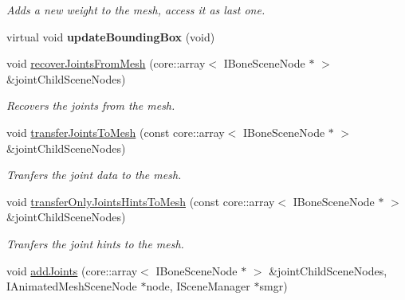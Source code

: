 \begin{DoxyCompactItemize}
\begin{DoxyCompactList}\small\item\em Adds a new weight to the mesh, access it as last one. \end{DoxyCompactList}\item 
\hypertarget{classirr_1_1scene_1_1_c_skinned_mesh_a9049fdf0faaa79fc27394571ddc62e58}{virtual void {\bfseries update\-Bounding\-Box} (void)}\label{classirr_1_1scene_1_1_c_skinned_mesh_a9049fdf0faaa79fc27394571ddc62e58}

\item 
\hypertarget{classirr_1_1scene_1_1_c_skinned_mesh_aed212277278110657517e474adddaff9}{void \hyperlink{classirr_1_1scene_1_1_c_skinned_mesh_aed212277278110657517e474adddaff9}{recover\-Joints\-From\-Mesh} (core\-::array$<$ I\-Bone\-Scene\-Node $\ast$ $>$ \&joint\-Child\-Scene\-Nodes)}\label{classirr_1_1scene_1_1_c_skinned_mesh_aed212277278110657517e474adddaff9}

\begin{DoxyCompactList}\small\item\em Recovers the joints from the mesh. \end{DoxyCompactList}\item 
\hypertarget{classirr_1_1scene_1_1_c_skinned_mesh_a7891a561328ce9c4ad056a981f3c61d1}{void \hyperlink{classirr_1_1scene_1_1_c_skinned_mesh_a7891a561328ce9c4ad056a981f3c61d1}{transfer\-Joints\-To\-Mesh} (const core\-::array$<$ I\-Bone\-Scene\-Node $\ast$ $>$ \&joint\-Child\-Scene\-Nodes)}\label{classirr_1_1scene_1_1_c_skinned_mesh_a7891a561328ce9c4ad056a981f3c61d1}

\begin{DoxyCompactList}\small\item\em Tranfers the joint data to the mesh. \end{DoxyCompactList}\item 
\hypertarget{classirr_1_1scene_1_1_c_skinned_mesh_a982b1826ff1df1ea2b122e4805a0cfbd}{void \hyperlink{classirr_1_1scene_1_1_c_skinned_mesh_a982b1826ff1df1ea2b122e4805a0cfbd}{transfer\-Only\-Joints\-Hints\-To\-Mesh} (const core\-::array$<$ I\-Bone\-Scene\-Node $\ast$ $>$ \&joint\-Child\-Scene\-Nodes)}\label{classirr_1_1scene_1_1_c_skinned_mesh_a982b1826ff1df1ea2b122e4805a0cfbd}

\begin{DoxyCompactList}\small\item\em Tranfers the joint hints to the mesh. \end{DoxyCompactList}\item 
\hypertarget{classirr_1_1scene_1_1_c_skinned_mesh_aa29a408757bd211083f015cc051af1f7}{void \hyperlink{classirr_1_1scene_1_1_c_skinned_mesh_aa29a408757bd211083f015cc051af1f7}{add\-Joints} (core\-::array$<$ I\-Bone\-Scene\-Node $\ast$ $>$ \&joint\-Child\-Scene\-Nodes, I\-Animated\-Mesh\-Scene\-Node $\ast$node, I\-Scene\-Manager $\ast$smgr)}\label{classirr_1_1scene_1_1_c_skinned_mesh_aa29a408757bd211083f015cc051af1f7}


\end{DoxyCompactItemize}
